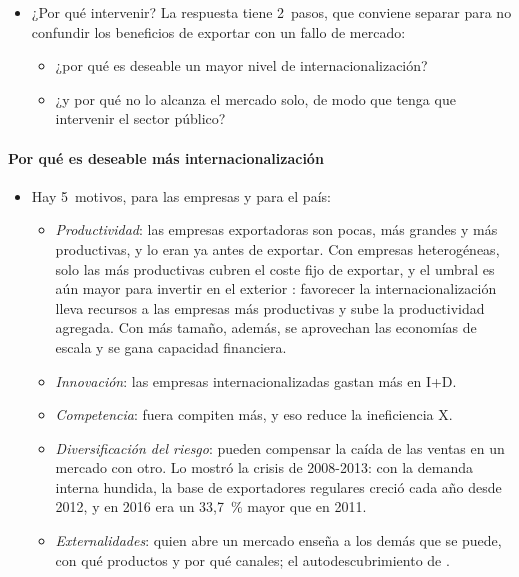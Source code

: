 \documentclass[11pt]{article}
\begin{document}
\begin{itemize}
\item ¿Por qué intervenir? La respuesta tiene 2~pasos, que conviene separar para no confundir los beneficios de exportar con un fallo de mercado:
  \begin{itemize}
  \item ¿por qué es deseable un mayor nivel de internacionalización?
  \item ¿y por qué no lo alcanza el mercado solo, de modo que tenga que intervenir el sector público?
  \end{itemize}
\end{itemize}

\paragraph{Por qué es deseable más internacionalización}

\begin{itemize}
\item Hay 5~motivos, para las empresas y para el país:
  \begin{itemize}
  \item \emph{Productividad}: las empresas exportadoras son pocas, más grandes y más productivas, y lo eran ya antes de exportar\nocite{BernardJensen1999Exceptional,BernardJensenReddingSchott2007Firms,OMC2008WTR}. Con empresas heterogéneas, solo las más productivas cubren el coste fijo de exportar\nocite{Melitz2003Impact}, y el umbral es aún mayor para invertir en el exterior\nocite{HelpmanMelitzYeaple2004Export} : favorecer la internacionalización lleva recursos a las empresas más productivas y sube la productividad agregada. Con más tamaño, además, se aprovechan las economías de escala y se gana capacidad financiera.
  \item \emph{Innovación}: las empresas internacionalizadas gastan más en I+D.
  \item \emph{Competencia}: fuera compiten más, y eso reduce la ineficiencia X\nocite{Leibenstein1966Allocative}.
  \item \emph{Diversificación del riesgo}: pueden compensar la caída de las ventas en un mercado con otro. Lo mostró la crisis de 2008-2013: con la demanda interna hundida, la base de exportadores regulares creció cada año desde 2012, y en 2016 era un 33,7~\% mayor que en 2011\nocite{SEC2017Estrategia}.
  \item \emph{Externalidades}: quien abre un mercado enseña a los demás que se puede, con qué productos y por qué canales; el autodescubrimiento de \textcite{HausmannRodrik2003} .
  \end{itemize}
\end{itemize}
\end{document}
